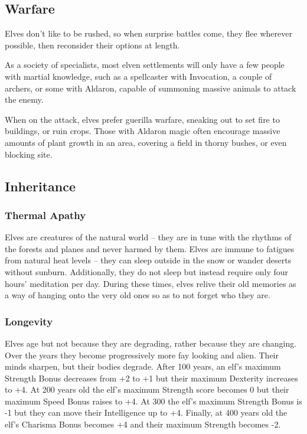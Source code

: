 \begin{multicols}{2}
\subsection{Warfare}

Elves don't like to be rushed, so when surprise battles come, they flee wherever possible, then reconsider their options at length.

As a society of specialists, most elven settlements will only have a few people with martial knowledge, such as a spellcaster with Invocation, a couple of archers, or some with Aldaron, capable of summoning massive animals to attack the enemy.

When on the attack, elves prefer guerilla warfare, sneaking out to set fire to buildings, or ruin crops.
Those with Aldaron magic often encourage massive amounts of plant growth in an area, covering a field in thorny bushes, or even blocking site.

\subsection{Inheritance}

\subsubsection[Thermal Apathy: take no penalties from natural weather.]{Thermal Apathy}
\label{elvenInheritance}

Elves are creatures of the natural world -- they are in tune with the rhythms of the forests and planes and never harmed by them.
Elves are immune to \glspl{fatigue} from natural heat levels -- they can sleep outside in the snow or wander deserts without sunburn.
Additionally, they do not sleep but instead require only four hours' meditation per day.
During these times, elves relive their old memories as a way of hanging onto the very old ones so as to not forget who they are.

\subsubsection{Longevity}

Elves age but not because they are degrading, rather because they are changing.
Over the years they become progressively more fay looking and alien.
Their minds sharpen, but their bodies degrade.
After 100 years, an elf's maximum Strength Bonus decreases from +2 to +1 but their maximum Dexterity increases to +4.
At 200 years old the elf's maximum Strength score becomes 0 but their maximum Speed Bonus raises to +4.
At 300 the elf's maximum Strength Bonus is -1 but they can move their Intelligence up to +4.
Finally, at 400 years old the elf's Charisma Bonus becomes +4 and their maximum Strength becomes -2.


\end{multicols}
